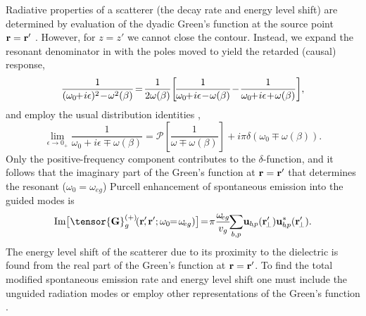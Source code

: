 \documentclass[aps,pra,twocolumn]{revtex4-1} %
\begin{document}
Radiative properties of a scatterer (the decay rate and energy level shift) are determined by evaluation of the dyadic Green's function at the source point $\mathbf{r} = \mathbf{r}'$ \cite{fussell_decay_2005}.  However, for $z=z'$ we cannot close the contour. Instead, we expand the resonant denominator in  with the poles moved to yield the retarded (causal) response,
\begin{equation}
\frac{1}{(\omega_0\!\!+\! i\epsilon)^2\!-\!\omega^2(\beta)} \!=\!\frac{1}{2 \omega(\beta)}\!\left[\! \frac{1}{\omega_0\!\!+\! i 
\epsilon \!-\! \omega(\beta)} \!-\! \frac{1}{\omega_0\!\!+\! i \epsilon \!+\! \omega(\beta)} \right]\!,\nn
\end{equation}
 and employ the usual distribution identities \cite{sondergaard_general_2001},
\begin{equation}
\!\!\!\!\lim_{\epsilon \!\rightarrow 0_+} \frac{1}{\omega_0 \!+\! i \epsilon \!\mp\! 
\omega(\beta)}=\mathcal{P}\left[\frac{1}{\omega \!\mp\! \omega(\beta)} \right] \!+\! i \pi \delta (\omega_0 \!\mp\! 
\omega(\beta)).
\end{equation}
Only the positive-frequency component contributes to the $\delta$-function, and it follows that the imaginary part of the Green's function at $\mathbf{r} = \mathbf{r}'$ that determines the resonant ($\omega_0 = \omega_{eg}$) Purcell enhancement of spontaneous emission into the guided modes is \cite{dung_spontaneous_2000, fussell_decay_2005, chen_finite-element_2010}
	\begin{equation}\label{Eq::ImGreenLocal}
		{\rm Im} \big[\tensor{\mathbf{G}}^{(+)}_g\!(\br'\!\!,\br'; \omega_0\!\!=\!\omega\!_{eg}) \big] \!=\! \pi \frac{\omega\!_{eg}}{v_g }\!\! \sum_{b, p}\! 
		\mathbf{u}_{b\!, p} (\br_{\!\perp}^\prime)\mathbf{u}^*_{b\! , p} (\br_{\!\perp}^\prime).
	\end{equation}
The energy level shift of the scatterer due to its proximity to the dielectric is found from the real part of the Green's function at $\mathbf{r} = \mathbf{r}'$. 
To find the total modified spontaneous emission rate and energy level shift one must include the unguided radiation modes \cite{le_kien_spontaneous_2005} or employ other representations of the Green's function \cite{klimov_spontaneous_2004}.  
\end{document}

